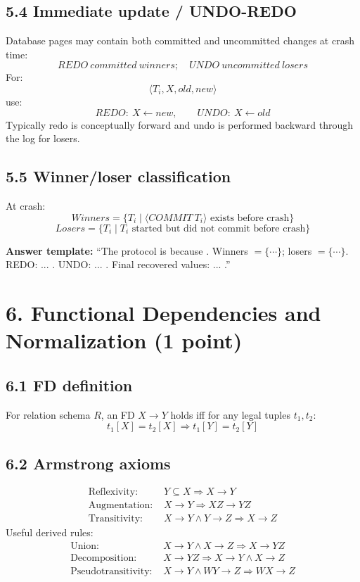 \documentclass[10pt,a4paper]{article}
\begin{document}
\subsection{5.4 Immediate update / UNDO-REDO}
Database pages may contain both committed and uncommitted changes at crash time:
\[
\boxed{REDO\ committed\ winners;\quad UNDO\ uncommitted\ losers}
\]
For:
\[
\langle T_i,X,old,new\rangle
\]
use:
\[
REDO:\ X\leftarrow new,\qquad UNDO:\ X\leftarrow old
\]
Typically redo is conceptually forward and undo is performed backward through the log for losers.

\subsection{5.5 Winner/loser classification}
At crash:
\[
Winners=\{T_i\mid \langle COMMIT\ T_i\rangle\text{ exists before crash}\}
\]
\[
Losers=\{T_i\mid T_i\text{ started but did not commit before crash}\}
\]

\begin{examanswer}
\textbf{Answer template:} ``The protocol is \underline{\hspace{1.5cm}} because \underline{\hspace{2cm}}. Winners $=\{\cdots\}$; losers $=\{\cdots\}$. REDO: ... . UNDO: ... . Final recovered values: ... .''
\end{examanswer}

\section{6. Functional Dependencies and Normalization (1 point)}

\subsection{6.1 FD definition}
For relation schema $R$, an FD $X\to Y$ holds iff for any legal tuples $t_1,t_2$:
\[
t_1[X]=t_2[X]\Rightarrow t_1[Y]=t_2[Y]
\]

\subsection{6.2 Armstrong axioms}
\begin{align*}
\text{Reflexivity: }& Y\subseteq X \Rightarrow X\to Y\\
\text{Augmentation: }& X\to Y \Rightarrow XZ\to YZ\\
\text{Transitivity: }& X\to Y\land Y\to Z \Rightarrow X\to Z
\end{align*}
Useful derived rules:
\begin{align*}
\text{Union: }& X\to Y\land X\to Z \Rightarrow X\to YZ\\
\text{Decomposition: }& X\to YZ \Rightarrow X\to Y\land X\to Z\\
\text{Pseudotransitivity: }& X\to Y\land WY\to Z \Rightarrow WX\to Z
\end{align*}
\end{document}
